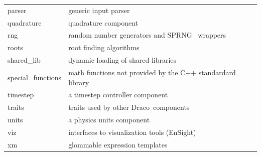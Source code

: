\documentclass[note]{ResearchNote}
\newcommand{\draco}{Draco}
\newcommand{\tableText}[1]{{\raggedright #1}}
\begin{document}
\begin{center}
\begin{tabular}{lp{4.0in}}
    \textsf{parser}       & \tableText{generic input parser} \\
    \textsf{quadrature}   & \tableText{quadrature component} \\
    \textsf{rng}          & \tableText{random number generators and SPRNG~\cite{ce97} wrappers} \\
    \textsf{roots}        & \tableText{root finding algorithms} \\
    \textsf{shared\_lib}  & \tableText{dynamic loading of shared libraries} \\
    \textsf{special\_functions} & \tableText{math functions not provided by the
      C++ standardard library} \\
    \textsf{timestep}     & \tableText{a timestep controller component} \\
    \textsf{traits}       & \tableText{traits used by other \draco\ components} \\
    \textsf{units}        & \tableText{a physics units component} \\
    \textsf{viz}          & \tableText{interfaces to visualization tools (EnSight)} \\
    \textsf{xm}           & \tableText{glommable expression templates} \\  
    \hline\hline 
  \end{tabular}
\end{center}
\end{document}

